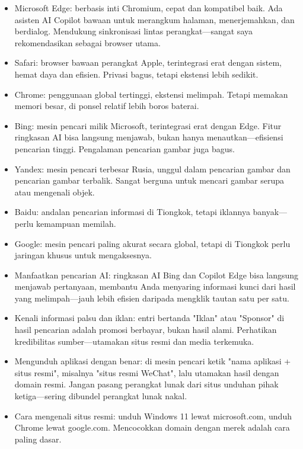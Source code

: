 
\begin{itemize}
  \item Microsoft Edge: berbasis inti Chromium, cepat dan kompatibel baik. Ada asisten AI Copilot bawaan untuk merangkum halaman, menerjemahkan, dan berdialog. Mendukung sinkronisasi lintas perangkat—sangat saya rekomendasikan sebagai browser utama.
  \item Safari: browser bawaan perangkat Apple, terintegrasi erat dengan sistem, hemat daya dan efisien. Privasi bagus, tetapi ekstensi lebih sedikit.
  \item Chrome: penggunaan global tertinggi, ekstensi melimpah. Tetapi memakan memori besar, di ponsel relatif lebih boros baterai.
\end{itemize}


\begin{itemize}
  \item Bing: mesin pencari milik Microsoft, terintegrasi erat dengan Edge. Fitur ringkasan AI bisa langsung menjawab, bukan hanya menautkan—efisiensi pencarian tinggi. Pengalaman pencarian gambar juga bagus.
  \item Yandex: mesin pencari terbesar Rusia, unggul dalam pencarian gambar dan pencarian gambar terbalik. Sangat berguna untuk mencari gambar serupa atau mengenali objek.
  \item Baidu: andalan pencarian informasi di Tiongkok, tetapi iklannya banyak—perlu kemampuan memilah.
  \item Google: mesin pencari paling akurat secara global, tetapi di Tiongkok perlu jaringan khusus untuk mengaksesnya.
\end{itemize}


\begin{itemize}
  \item Manfaatkan pencarian AI: ringkasan AI Bing dan Copilot Edge bisa langsung menjawab pertanyaan, membantu Anda menyaring informasi kunci dari hasil yang melimpah—jauh lebih efisien daripada mengklik tautan satu per satu.
  \item Kenali informasi palsu dan iklan: entri bertanda "Iklan" atau "Sponsor" di hasil pencarian adalah promosi berbayar, bukan hasil alami. Perhatikan kredibilitas sumber—utamakan situs resmi dan media terkemuka.
  \item Mengunduh aplikasi dengan benar: di mesin pencari ketik "nama aplikasi + situs resmi", misalnya "situs resmi WeChat", lalu utamakan hasil dengan domain resmi. Jangan pasang perangkat lunak dari situs unduhan pihak ketiga—sering dibundel perangkat lunak nakal.
  \item Cara mengenali situs resmi: unduh Windows 11 lewat microsoft.com, unduh Chrome lewat google.com. Mencocokkan domain dengan merek adalah cara paling dasar.
\end{itemize}

